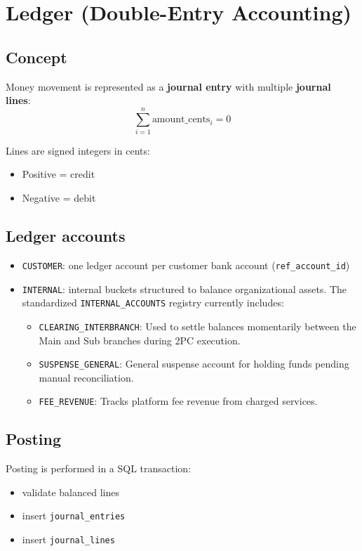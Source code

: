 \section{Ledger (Double-Entry Accounting)}
\subsection{Concept}
Money movement is represented as a \textbf{journal entry} with multiple \textbf{journal lines}:
\[
\sum_{i=1}^{n} \text{amount\_cents}_i = 0
\]

Lines are signed integers in cents:
\begin{itemize}[nosep]
  \item Positive = credit
  \item Negative = debit
\end{itemize}

\subsection{Ledger accounts}
\begin{itemize}[nosep]
  \item \texttt{CUSTOMER}: one ledger account per customer bank account (\texttt{ref\_account\_id})
  \item \texttt{INTERNAL}: internal buckets structured to balance organizational assets. The standardized \texttt{INTERNAL\_ACCOUNTS} registry currently includes:
  \begin{itemize}[nosep]
    \item \texttt{CLEARING\_INTERBRANCH}: Used to settle balances momentarily between the Main and Sub branches during 2PC execution.
    \item \texttt{SUSPENSE\_GENERAL}: General suspense account for holding funds pending manual reconciliation.
    \item \texttt{FEE\_REVENUE}: Tracks platform fee revenue from charged services.
  \end{itemize}
\end{itemize}

\subsection{Posting}
Posting is performed in a SQL transaction:
\begin{itemize}[nosep]
  \item validate balanced lines
  \item insert \texttt{journal\_entries}
  \item insert \texttt{journal\_lines}
\end{itemize}

